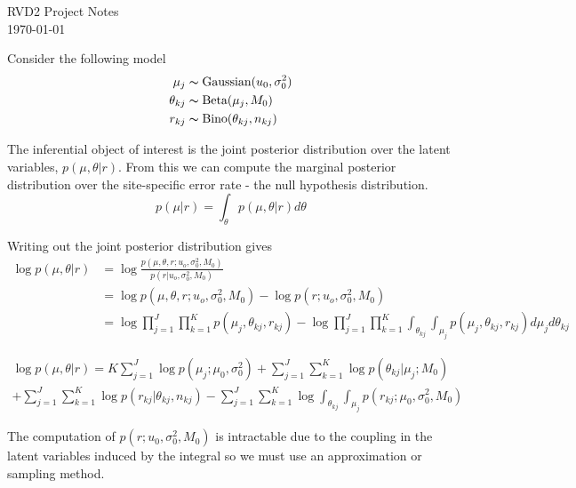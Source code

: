 \documentclass[10pt, letterpaper]{article}
\begin{document}
\linespread{1} %
\small \normalsize %
\begin{flushright}
RVD2 Project Notes \\
\today
\end{flushright}

Consider the following model
\begin{align}
\mu_j &\thicksim \text{Gaussian}(u_0,\sigma^2_0)\\
\theta_{kj} &\thicksim \text{Beta}(\mu_j,M_0)\\
r_{kj} &\thicksim \text{Bino}(\theta_{kj}, n_{kj})
\end{align}

The inferential object of interest is the joint posterior distribution over the latent variables, $p(\mu,\theta|r)$. From this we can compute the marginal posterior distribution over the site-specific error rate - the null hypothesis distribution.
\begin{equation}
p(\mu|r) = \int_\theta p(\mu,\theta|r)d\theta
\end{equation}

Writing out the joint posterior distribution gives
\begin{equation}
\begin{split}
\log p(\mu,\theta | r)& = \log \frac{p(\mu,\theta,r;u_o,\sigma^2_0,M_0)}{p(r | u_o,\sigma^2_0,M_0)}\\
& = \log p(\mu,\theta,r;u_o,\sigma^2_0,M_0) - \log p(r ; u_o, \sigma^2_0,M_0)\\
& = \log \prod_{j=1}^J \prod_{k=1}^K p(\mu_j,\theta_{kj}, r_{kj}) - \log \prod_{j=1}^J \prod_{k=1}^K \int_{\theta_{kj}} \int_{\mu_j} p(\mu_j,\theta_{kj}, r_{kj})d\mu_jd\theta_{kj}
\end{split}
\end{equation}

\begin{multline}
\log p(\mu,\theta | r) = K\sum_{j=1}^J \log p(\mu_j;\mu_0,\sigma^2_0) + \sum_{j=1}^J \sum_{k=1}^K \log p(\theta_{kj} | \mu_j;M_0)\\ + \sum_{j=1}^J \sum_{k=1}^K\log p(r_{kj} | \theta_{kj}, n_{kj})
- \sum_{j=1}^J \sum_{k=1}^K \log \int_{\theta_{kj}} \int_{\mu_j} p(r_{kj};\mu_0,\sigma^2_0,M_0) \end{multline}

The computation of $p(r;u_0,\sigma_0^2,M_0)$ is intractable due to the coupling in the latent variables induced by the integral so we must use an approximation or sampling method.
\end{document}
